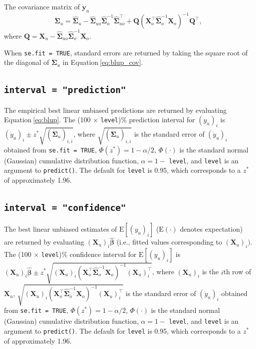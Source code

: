 \documentclass[10pt,letterpaper]{article}
\begin{document}
The covariance matrix of \(\mathbf{\dot{y}}_u\)
\begin{equation}\label{eq:blup_cov}
  \dot{\boldsymbol{\Sigma}}_u = \hat{\boldsymbol{\Sigma}}_u - \hat{\boldsymbol{\Sigma}}_{uo} \hat{\boldsymbol{\Sigma}}^{-1}_o \hat{\boldsymbol{\Sigma}}^\top_{uo} + \mathbf{Q}(\mathbf{X}_o^\top \hat{\boldsymbol{\Sigma}}_o^{-1} \mathbf{X}_o)^{-1}\mathbf{Q}^\top ,
\end{equation} where
\(\mathbf{Q} = \mathbf{X}_u - \hat{\boldsymbol{\Sigma}}_{uo} \hat{\boldsymbol{\Sigma}}^{-1}_o \mathbf{X}_o\).

When \texttt{se.fit\ =\ TRUE}, standard errors are returned by taking
the square root of the diagonal of \(\dot{\boldsymbol{\Sigma}}_u\) in
Equation\(~\)\ref{eq:blup_cov}.

\hypertarget{interval-prediction}{%
\subsection{\texorpdfstring{\texttt{interval\ =\ "prediction"}}{interval = "prediction"}}\label{interval-prediction}}

The empirical best linear unbiased predictions are returned by
evaluating Equation\(~\)\ref{eq:blup}. The (100 \(\times\)
\texttt{level})\% prediction interval for \((y_u)_i\) is
\((\dot{y}_u)_i \pm z^* \sqrt{(\dot{\boldsymbol{\Sigma}}_u)_{i, i}}\),
where \(\sqrt{(\dot{\boldsymbol{\Sigma}}_u)_{i, i}}\) is the standard
error of \((\dot{y}_u)_i\) obtained from \texttt{se.fit\ =\ TRUE},
\(\Phi(z^*) = 1 - \alpha / 2\), \(\Phi(\cdot)\) is the standard normal
(Gaussian) cumulative distribution function, \(\alpha = 1 -\)
\texttt{level}, and \texttt{level} is an argument to \texttt{predict()}.
The default for \texttt{level} is 0.95, which corresponds to a \(z^*\)
of approximately 1.96.

\hypertarget{interval-confidence}{%
\subsection{\texorpdfstring{\texttt{interval\ =\ "confidence"}}{interval = "confidence"}}\label{interval-confidence}}

The best linear unbiased estimates of \(\text{E}[(y_u)_i]\)
(\(\text{E}(\cdot)\) denotes expectation) are returned by evaluating
\((\mathbf{X}_u)_i \hat{\boldsymbol{\beta}}\) (i.e., fitted values
corresponding to \((\mathbf{X}_u)_i)\). The (100 \(\times\)
\texttt{level})\% confidence interval for \(\text{E}[(y_u)_i]\) is
\((\mathbf{X}_u)_i \hat{\boldsymbol{\beta}} \pm z^* \sqrt{(\mathbf{X}_u)_i (\mathbf{X}^\top_o \hat{\boldsymbol{\Sigma}}_o^{-1} \mathbf{X}_o)^{-1} (\mathbf{X}_u)_i^\top}\),
where \((\mathbf{X}_u)_i\) is the \(i\)th row of \(\mathbf{X}_u\),
\(\sqrt{(\mathbf{X}_u)_i (\mathbf{X}^\top_o \hat{\boldsymbol{\Sigma}}_o^{-1} \mathbf{X}_o)^{-1} (\mathbf{X}_u)_i^\top}\)
is the standard error of \((\dot{y}_u)_i\) obtained from
\texttt{se.fit\ =\ TRUE}, \(\Phi(z^*) = 1 - \alpha / 2\),
\(\Phi(\cdot)\) is the standard normal (Gaussian) cumulative
distribution function, \(\alpha = 1 -\) \texttt{level}, and
\texttt{level} is an argument to \texttt{predict()}. The default for
\texttt{level} is 0.95, which corresponds to a \(z^*\) of approximately
1.96.
\end{document}
